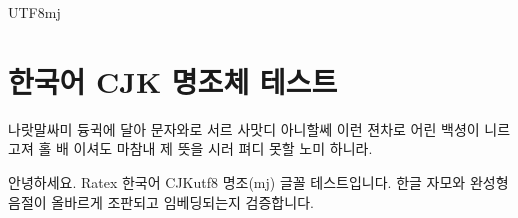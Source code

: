 \documentclass{article}
\begin{document}
\begin{CJK}{UTF8}{mj}
\section*{한국어 CJK 명조체 테스트}
나랏말싸미 듕귁에 달아 문자와로 서르 사맛디 아니할쎄
이런 젼차로 어린 백셩이 니르고져 홀 배 이셔도
마참내 제 뜻을 시러 펴디 못할 노미 하니라.

안녕하세요. Ratex 한국어 CJKutf8 명조(mj) 글꼴 테스트입니다.
한글 자모와 완성형 음절이 올바르게 조판되고 임베딩되는지 검증합니다.
\end{CJK}
\end{document}
